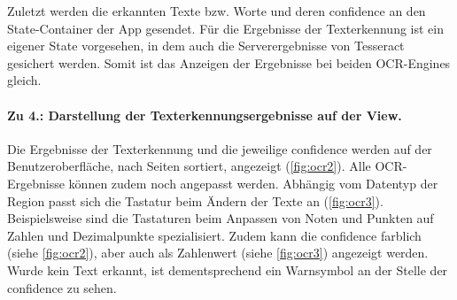 \documentclass[notables, nomenclature, oneside, 150]{HSMW-Thesis}
\begin{document}
					Zuletzt werden die erkannten Texte bzw. Worte und deren confidence an den State-Container der App gesendet. Für die Ergebnisse der Texterkennung ist ein eigener State vorgesehen, in dem auch die Serverergebnisse von Tesseract gesichert werden. Somit ist das Anzeigen der Ergebnisse bei beiden OCR-Engines gleich.  
				
				\paragraph*{Zu 4.: Darstellung der Texterkennungsergebnisse auf der View.}
					Die Ergebnisse der Texterkennung und die jeweilige confidence werden auf der Benutzeroberfläche, nach Seiten sortiert, angezeigt (\ref{fig:ocr2}). Alle OCR-Ergebnisse können zudem noch angepasst werden. Abhängig vom Datentyp der Region passt sich die Tastatur beim Ändern der Texte an (\ref{fig:ocr3}). Beispielsweise sind die Tastaturen beim Anpassen von Noten und Punkten auf Zahlen und Dezimalpunkte spezialisiert. Zudem kann die confidence farblich (siehe \autoref{fig:ocr2}), aber auch als Zahlenwert (siehe \autoref{fig:ocr3}) angezeigt werden. Wurde kein Text erkannt, ist dementsprechend ein Warnsymbol an der Stelle der confidence zu sehen.  
 
\end{document}

